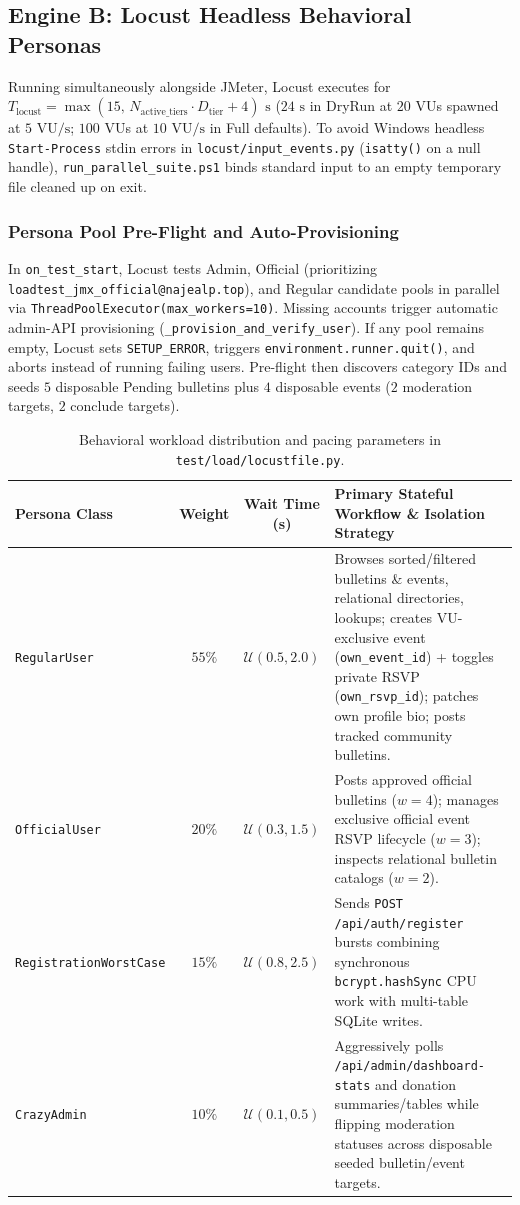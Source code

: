 \documentclass[11pt,letterpaper]{article}
\begin{document}
\subsection{Engine B: Locust Headless Behavioral Personas}
Running simultaneously alongside JMeter, Locust executes for $T_{\text{locust}} = \max(15,\, N_{\text{active\_tiers}} \cdot D_{\text{tier}} + 4)\text{ s}$ ($24\text{ s}$ in DryRun at $20$ VUs spawned at $5\text{ VU/s}$; $100$ VUs at $10\text{ VU/s}$ in Full defaults). To avoid Windows headless \texttt{Start-Process} stdin errors in \texttt{locust/input\_events.py} (\texttt{isatty()} on a null handle), \texttt{run\_parallel\_suite.ps1} binds standard input to an empty temporary file cleaned up on exit.

\subsubsection{Persona Pool Pre-Flight and Auto-Provisioning}
In \texttt{on\_test\_start}, Locust tests Admin, Official (prioritizing \texttt{loadtest\_jmx\_official@najealp.top}), and Regular candidate pools in parallel via \texttt{ThreadPoolExecutor(max\_workers=10)}. Missing accounts trigger automatic admin-API provisioning (\texttt{\_provision\_and\_verify\_user}). If any pool remains empty, Locust sets \texttt{SETUP\_ERROR}, triggers \texttt{environment.runner.quit()}, and aborts instead of running failing users. Pre-flight then discovers category IDs and seeds $5$ disposable Pending bulletins plus $4$ disposable events ($2$ moderation targets, $2$ conclude targets).

\begin{table}[H]
\centering
\caption{Behavioral workload distribution and pacing parameters in \texttt{test/load/locustfile.py}.}
\label{tab:personas}
\small
\begin{tabularx}{\textwidth}{@{}l c c X@{}}
\toprule
\textbf{Persona Class} & \textbf{Weight} & \textbf{Wait Time (s)} & \textbf{Primary Stateful Workflow \& Isolation Strategy} \\
\midrule
\texttt{RegularUser} & $55\%$ & $\mathcal{U}(0.5, 2.0)$ & Browses sorted/filtered bulletins \& events, relational directories, lookups; creates VU-exclusive event (\texttt{own\_event\_id}) + toggles private RSVP (\texttt{own\_rsvp\_id}); patches own profile bio; posts tracked community bulletins. \\
\texttt{OfficialUser} & $20\%$ & $\mathcal{U}(0.3, 1.5)$ & Posts approved official bulletins ($w=4$); manages exclusive official event RSVP lifecycle ($w=3$); inspects relational bulletin catalogs ($w=2$). \\
\texttt{RegistrationWorstCase} & $15\%$ & $\mathcal{U}(0.8, 2.5)$ & Sends \texttt{POST /api/auth/register} bursts combining synchronous \texttt{bcrypt.hashSync} CPU work with multi-table SQLite writes. \\
\texttt{CrazyAdmin} & $10\%$ & $\mathcal{U}(0.1, 0.5)$ & Aggressively polls \texttt{/api/admin/dashboard-stats} and donation summaries/tables while flipping moderation statuses across disposable seeded bulletin/event targets. \\
\bottomrule
\end{tabularx}
\end{table}
\end{document}
